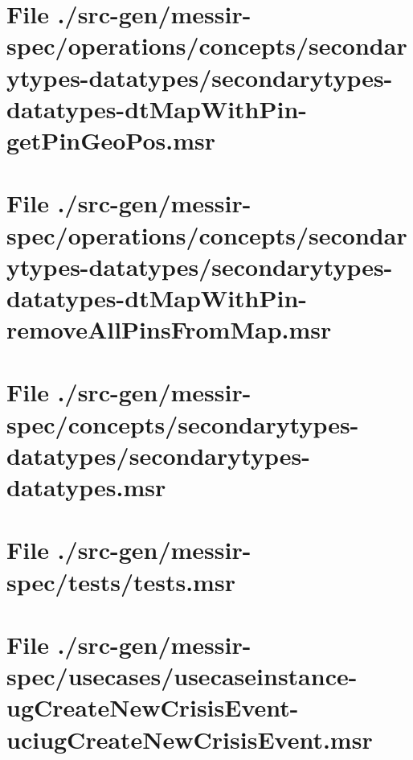 \section[File /src-gen.../secondarytypes-datatypes-dtMapWithPin-getPinGeoPos.msr]{File ./src-gen/messir-spec/operations/concepts/secondarytypes-datatypes/secondarytypes-datatypes-dtMapWithPin-getPinGeoPos.msr}
\scriptsize

\normalsize
	
\section[File /src-gen.../secondarytypes-datatypes-dtMapWithPin-removeAllPinsFromMap.msr]{File ./src-gen/messir-spec/operations/concepts/secondarytypes-datatypes/secondarytypes-datatypes-dtMapWithPin-removeAllPinsFromMap.msr}
\scriptsize

\normalsize
	
\section[File /src-gen/messir-spec/concepts.../secondarytypes-datatypes.msr]{File ./src-gen/messir-spec/concepts/secondarytypes-datatypes/secondarytypes-datatypes.msr}
\scriptsize

\normalsize
	
\section[File /src-gen/messir-spec/tests/tests.msr]{File ./src-gen/messir-spec/tests/tests.msr}
\scriptsize

\normalsize
	
\section[File /.../usecaseinstance-ugCreateNewCrisisEvent-uciugCreateNewCrisisEvent.msr]{File ./src-gen/messir-spec/usecases/usecaseinstance-ugCreateNewCrisisEvent-uciugCreateNewCrisisEvent.msr}
\scriptsize

\normalsize
	
